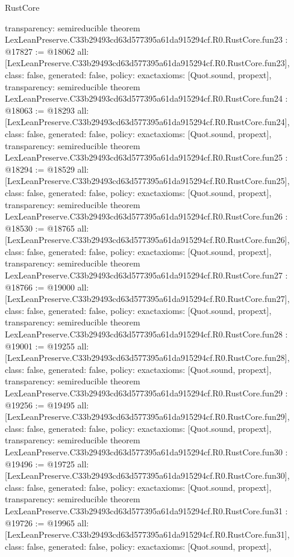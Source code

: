 \begin{lexlean}{RustCore}
\begin{coremodule}
{  transparency: semireducible
}
theorem LexLeanPreserve.C33b29493cd63d577395a61da915294cf.R0.RustCore.fun23 : @17827 := @18062 {
  all: [LexLeanPreserve.C33b29493cd63d577395a61da915294cf.R0.RustCore.fun23],
  class: false,
  generated: false,
  policy: exact{axioms: [Quot.sound, propext]},
  transparency: semireducible
}
theorem LexLeanPreserve.C33b29493cd63d577395a61da915294cf.R0.RustCore.fun24 : @18063 := @18293 {
  all: [LexLeanPreserve.C33b29493cd63d577395a61da915294cf.R0.RustCore.fun24],
  class: false,
  generated: false,
  policy: exact{axioms: [Quot.sound, propext]},
  transparency: semireducible
}
theorem LexLeanPreserve.C33b29493cd63d577395a61da915294cf.R0.RustCore.fun25 : @18294 := @18529 {
  all: [LexLeanPreserve.C33b29493cd63d577395a61da915294cf.R0.RustCore.fun25],
  class: false,
  generated: false,
  policy: exact{axioms: [Quot.sound, propext]},
  transparency: semireducible
}
theorem LexLeanPreserve.C33b29493cd63d577395a61da915294cf.R0.RustCore.fun26 : @18530 := @18765 {
  all: [LexLeanPreserve.C33b29493cd63d577395a61da915294cf.R0.RustCore.fun26],
  class: false,
  generated: false,
  policy: exact{axioms: [Quot.sound, propext]},
  transparency: semireducible
}
theorem LexLeanPreserve.C33b29493cd63d577395a61da915294cf.R0.RustCore.fun27 : @18766 := @19000 {
  all: [LexLeanPreserve.C33b29493cd63d577395a61da915294cf.R0.RustCore.fun27],
  class: false,
  generated: false,
  policy: exact{axioms: [Quot.sound, propext]},
  transparency: semireducible
}
theorem LexLeanPreserve.C33b29493cd63d577395a61da915294cf.R0.RustCore.fun28 : @19001 := @19255 {
  all: [LexLeanPreserve.C33b29493cd63d577395a61da915294cf.R0.RustCore.fun28],
  class: false,
  generated: false,
  policy: exact{axioms: [Quot.sound, propext]},
  transparency: semireducible
}
theorem LexLeanPreserve.C33b29493cd63d577395a61da915294cf.R0.RustCore.fun29 : @19256 := @19495 {
  all: [LexLeanPreserve.C33b29493cd63d577395a61da915294cf.R0.RustCore.fun29],
  class: false,
  generated: false,
  policy: exact{axioms: [Quot.sound, propext]},
  transparency: semireducible
}
theorem LexLeanPreserve.C33b29493cd63d577395a61da915294cf.R0.RustCore.fun30 : @19496 := @19725 {
  all: [LexLeanPreserve.C33b29493cd63d577395a61da915294cf.R0.RustCore.fun30],
  class: false,
  generated: false,
  policy: exact{axioms: [Quot.sound, propext]},
  transparency: semireducible
}
theorem LexLeanPreserve.C33b29493cd63d577395a61da915294cf.R0.RustCore.fun31 : @19726 := @19965 {
  all: [LexLeanPreserve.C33b29493cd63d577395a61da915294cf.R0.RustCore.fun31],
  class: false,
  generated: false,
  policy: exact{axioms: [Quot.sound, propext]},
}
\end{coremodule}
\end{lexlean}
